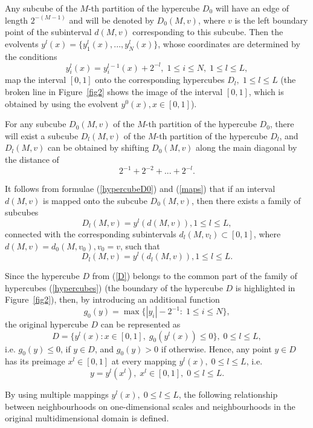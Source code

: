 \documentclass[entropy,article,submit,moreauthors,pdftex]{Definitions/mdpi}
\begin{document}
Any subcube of the $M$-th partition of the hypercube $D_0$ will have an edge of length $2^{-(M-1)}$ and will be denoted by $D_0(M, v)$, where $v$ is the left boundary point of the subinterval $d(M, v)$ corresponding to this subcube. Then the evolvents $y^l(x)=\{y_1^l(x), ..., y_N^l(x)\}$, whose coordinates are determined by the conditions
\begin{equation}\label{maps}
y_i^l(x) = y_i^{l-1}(x) + 2^{-l}, \; 1 \leq i \leq N, \; 1 \leq l \leq L,
\end{equation} 
map the interval $[0,1]$ onto the corresponding hypercubes  $D_l, \; 1 \leq l \leq L$ (the broken line in Figure~\ref{fig2} shows the image of the interval $[0,1]$, which is obtained by using the evolvent $y^0(x), x \in [0,1]$).

For any subcube $D_0(M,v)$ of the $M$-th partition of the hypercube $D_0$, there will exist a subcube $D_l(M,v)$ of the $M$-th partition of the hypercube $D_l$, and $D_l(M,v)$ can be obtained by shifting $D_0(M,v)$ along the main diagonal by the distance of 
\[
2^{-1}+2^{-2}+...+2^{-l}.
\] 

It follows from formulae (\ref{hypercubeD0}) and (\ref{maps}) that if an interval $d(M,v)$ is mapped onto the subcube $D_0(M,v)$, then there exists a family of subcubes
\[
D_l(M,v) = y^l(d(M,v)), 1 \leq l \leq L,
\]
connected with the corresponding subintervals $d_l(M,v_l) \subset [0,1]$, where $d(M,v) = d_0(M,v_0), v_0 = v$, such that 
\[
D_l(M,v) = y^l(d_l(M,v)), 1 \leq l \leq L.
\] 

Since the hypercube $D$ from (\ref{D}) belongs to the common part of the family of hypercubes (\ref{hypercubes}) (the boundary of the hypercube $D$ is highlighted in Figure~\ref{fig2}), then, by introducing an additional function 
\[
g_0(y) = \max \{ |y_i|-2^{-1}: \; 1 \leq i \leq N \},
\] 
the original hypercube $D$ can be represented as
\[
D = \{y^l(x): x \in [0,1], \; g_0(y^l(x)) \leq 0 \}, \; 0 \leq l \leq L,
\] 
i.e. $g_0(y) \leq 0$, if $y \in D$, and $g_0(y) > 0$ if otherwise. Hence, any point $y \in D$ has its preimage $x^l \in [0,1]$ at every mapping $y^l(x), \; 0 \leq l \leq L$, i.e.
\[
y = y^l(x^l), \; x^l \in [0, 1], \; 0 \leq l \leq L.
\] 

By using multiple mappings $y^l(x), \; 0 \leq l \leq L$, the following relationship between neighbourhoods on one-dimensional scales and neighbourhoods in the original multidimensional domain is defined.
\end{document}
